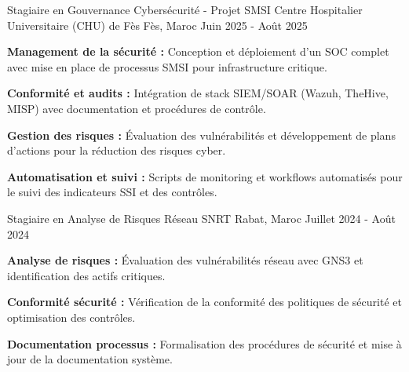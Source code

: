 
\begin{cventries}

    \cventry
    {Stagiaire en Gouvernance Cybersécurité - Projet SMSI} %
    {Centre Hospitalier Universitaire (CHU) de Fès} %
    {Fès, Maroc} %
    {Juin 2025 - Août 2025} %
    {
        \begin{cvitems}
            \item {
                        \textbf{Management de la sécurité :} Conception et déploiement d'un SOC complet avec mise en place de processus SMSI pour infrastructure critique.}
            \item {
                        \textbf{Conformité et audits :} Intégration de stack SIEM/SOAR (Wazuh, TheHive, MISP) avec documentation et procédures de contrôle.}
            \item {
                        \textbf{Gestion des risques :} Évaluation des vulnérabilités et développement de plans d'actions pour la réduction des risques cyber.}
            \item {
                        \textbf{Automatisation et suivi :} Scripts de monitoring et workflows automatisés pour le suivi des indicateurs SSI et des contrôles.}
        \end{cvitems}
    }

    \cventry
    {Stagiaire en Analyse de Risques Réseau} %
    {SNRT} %
    {Rabat, Maroc} %
    {Juillet 2024 - Août 2024} %
    {
        \begin{cvitems} %
            \item {\textbf{Analyse de risques :} Évaluation des vulnérabilités réseau avec GNS3 et identification des actifs critiques.}
            \item {\textbf{Conformité sécurité :} Vérification de la conformité des politiques de sécurité et optimisation des contrôles.}
            \item {\textbf{Documentation processus :} Formalisation des procédures de sécurité et mise à jour de la documentation système.}
        \end{cvitems}
    }


\end{cventries}

